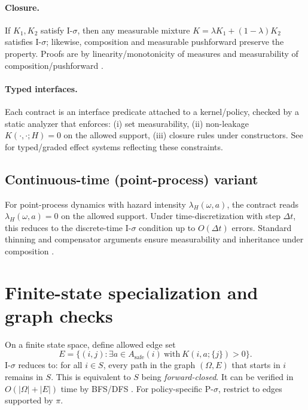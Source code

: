 \documentclass[11pt]{article}
\theoremstyle{plain}
\theoremstyle{definition}
\theoremstyle{remark}
\newcommand{\1}{\mathbbm{1}}
\begin{document}
\paragraph{Closure.}
If \(K_1,K_2\) satisfy I-\(\sigma\), then any measurable mixture \(K=\lambda K_1+(1-\lambda)K_2\) satisfies I-\(\sigma\); likewise, composition and measurable pushforward preserve the property. Proofs are by linearity/monotonicity of measures and measurability of composition/pushforward \parencite[Chs.~1--2]{Bogachev2007}.

\paragraph{Typed interfaces.}
Each contract is an interface predicate attached to a kernel/policy, checked by a static analyzer that enforces: (i) set measurability, (ii) non-leakage \(K(\cdot,\cdot;H)=0\) on the allowed support, (iii) closure rules under constructors. See \parencite{elliott2025contracts,elliott2025graded} for typed/graded effect systems reflecting these constraints.

\subsection{Continuous-time (point-process) variant}\label{sec:ct}
For point-process dynamics with hazard intensity \(\lambda_H(\omega,a)\), the contract reads \(\lambda_H(\omega,a)=0\) on the allowed support. Under time-discretization with step \(\Delta t\), this reduces to the discrete-time I-\(\sigma\) condition up to \(O(\Delta t)\) errors. Standard thinning and compensator arguments ensure measurability and inheritance under composition \parencite[§3.2]{MeynTweedie2009}.

\section{Finite-state specialization and graph checks}\label{sec:finite}
On a finite state space, define allowed edge set
\[
E=\{(i,j):\exists a\in A_{\mathrm{safe}}(i)\ \text{with}\ K(i,a;\{j\})>0\}.
\]
I-\(\sigma\) reduces to: for all \(i\in S\), every path in the graph \((\Omega,E)\) that starts in \(i\) remains in \(S\). This is equivalent to \(S\) being \emph{forward-closed}. It can be verified in \(O(|\Omega|+|E|)\) time by BFS/DFS \parencite[Ch.~22]{Cormen2009}. For policy-specific P-\(\sigma\), restrict to edges supported by \(\pi\).
\end{document}
